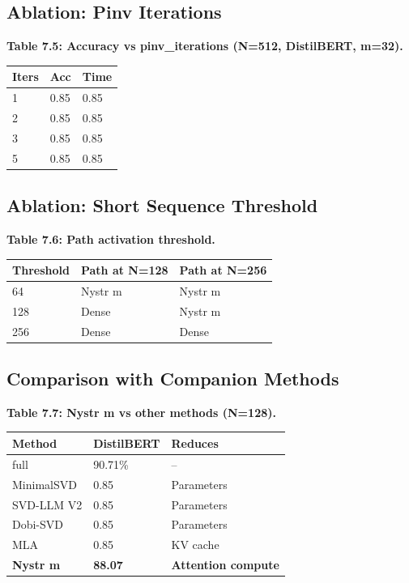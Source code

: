 \subsection{Ablation: Pinv Iterations}

\textbf{Table 7.5: Accuracy vs pinv\_iterations (N=512, DistilBERT, m=32).}

\begin{table}[H]
\centering
\small
\begin{tabular}{lll}
\toprule
\textbf{Iters} & \textbf{Acc} & \textbf{Time} \\
\midrule
1 & 0.85 & 0.85 \\
2 & 0.85 & 0.85 \\
3 & 0.85 & 0.85 \\
5 & 0.85 & 0.85 \\
\bottomrule
\end{tabular}
\end{table}

\subsection{Ablation: Short Sequence Threshold}

\textbf{Table 7.6: Path activation threshold.}

\begin{table}[H]
\centering
\small
\begin{tabular}{lll}
\toprule
\textbf{Threshold} & \textbf{Path at N=128} & \textbf{Path at N=256} \\
\midrule
64 & Nystr m & Nystr m \\
128 & Dense & Nystr m \\
256 & Dense & Dense \\
\bottomrule
\end{tabular}
\end{table}

\subsection{Comparison with Companion Methods}

\textbf{Table 7.7: Nystr m vs other methods (N=128).}

\begin{table}[H]
\centering
\small
\begin{tabular}{lll}
\toprule
\textbf{Method} & \textbf{DistilBERT} & \textbf{Reduces} \\
\midrule
full & 90.71\% & -- \\
MinimalSVD & 0.85 & Parameters \\
SVD-LLM V2 & 0.85 & Parameters \\
Dobi-SVD & 0.85 & Parameters \\
MLA & 0.85 & KV cache \\
\textbf{Nystr m} & \textbf{88.07} & \textbf{Attention compute} \\
\bottomrule
\end{tabular}
\end{table}

